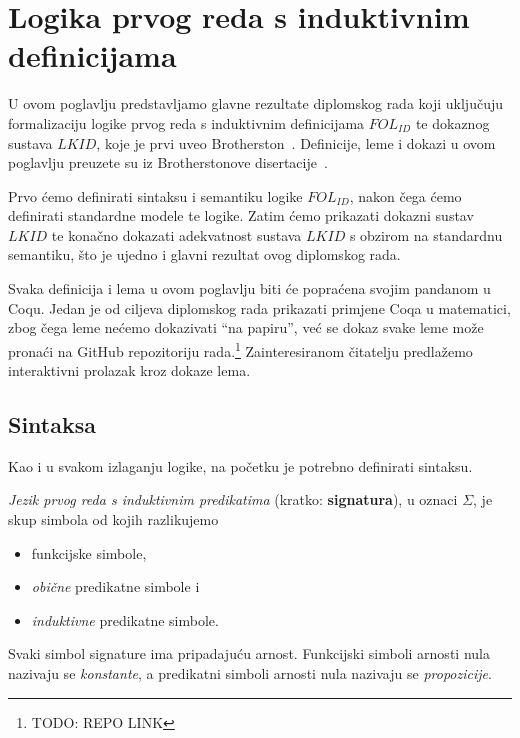 \chapter{Logika prvog reda s induktivnim definicijama}\label{cha:logika-prvog-reda}
U ovom poglavlju predstavljamo glavne rezultate diplomskog rada koji uključuju formalizaciju
logike prvog reda s induktivnim definicijama \(\mathit{FOL_{ID}}\)
te dokaznog sustava \(\mathit{LKID}\), koje je prvi uveo Brotherston~\cite{brotherston2005}.
Definicije, leme i dokazi u ovom poglavlju preuzete su iz Brotherstonove disertacije~\cite{brotherstonphd}.

Prvo ćemo definirati sintaksu i semantiku logike \(\mathit{FOL_{ID}}\),
nakon čega ćemo definirati standardne modele te logike.
Zatim ćemo prikazati dokazni sustav \(\mathit{LKID}\) te konačno dokazati adekvatnost
sustava \(LKID\) s obzirom na standardnu semantiku,
što je ujedno i glavni rezultat ovog diplomskog rada.

Svaka definicija i lema u ovom poglavlju biti će popraćena svojim pandanom u Coqu.
Jedan je od ciljeva diplomskog rada prikazati primjene Coqa u matematici,
zbog čega leme nećemo dokazivati ``na papiru'',
već se dokaz svake leme može pronaći na GitHub repozitoriju rada.\footnote{TODO: REPO LINK}
Zainteresiranom čitatelju predlažemo interaktivni prolazak kroz dokaze lema.

\section{Sintaksa}\label{sec:sintaksa}
Kao i u svakom izlaganju logike, na početku je potrebno definirati sintaksu.
\begin{definition}\label{def:signatura}
  \textit{Jezik prvog reda s induktivnim predikatima} (kratko: \textbf{signatura}), u oznaci \(\Sigma\),
  je skup simbola od kojih razlikujemo
  \begin{itemize}
  \item funkcijske simbole,
  \item \textit{obične} predikatne simbole i
  \item \textit{induktivne} predikatne simbole.
  \end{itemize}
\end{definition}
\begin{remark}
  Svaki simbol signature ima pripadajuću arnost.
  Funkcijski simboli arnosti nula nazivaju se \textit{konstante},
  a predikatni simboli arnosti nula nazivaju se \textit{propozicije}.
\end{remark}

